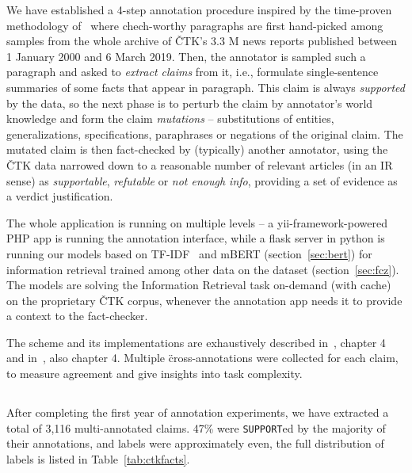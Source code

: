 We have established a 4-step annotation procedure inspired by the time-proven methodology of~\cite{fever} where chech-worthy paragraphs are first hand-picked among samples from the whole archive of ČTK's 3.3 M news reports published between 1 January 2000 and 6 March 2019. Then, the annotator is sampled such a paragraph and asked to \textit{extract claims} from it, i.e., formulate single-sentence summaries of some facts that appear in paragraph. This claim is always \textit{supported} by the data, so the next phase is to perturb the claim by annotator's world knowledge and form the claim \textit{mutations} -- substitutions of entities, generalizations, specifications, paraphrases or negations of the original claim. 
The mutated claim is then fact-checked by (typically) another annotator, using the ČTK data narrowed down to a reasonable number of relevant articles (in an IR sense) as \textit{supportable}, \textit{refutable} or \textit{not enough info}, providing a set of evidence as a verdict justification.

The whole application is running on multiple levels -- a yii-framework-powered PHP app is running the annotation interface, while a flask server in python is running our models based on TF-IDF~\cite{drqa} and mBERT (section~\ref{sec:bert}) for information retrieval trained among other data on the \FCZ dataset (section~\ref{sec:fcz}).
The models are solving the Information Retrieval task on-demand (with cache) on the proprietary ČTK corpus, whenever the annotation app needs it to provide a context to the fact-checker.

The scheme and its implementations are exhaustively described in~\cite{diplomka}, chapter 4 and in~\cite{lrev}, also chapter 4.
Multiple \"{cross-annotations} were collected for each claim, to measure agreement and give insights into task complexity.

\subsection{\CTK}
\label{sec:ctkfacts}


After completing the first year of annotation experiments, we have extracted a total of 3,116 multi-annotated claims.
47\% were \texttt{SUPPORT}ed by the majority of their annotations, \REF{} and \NEI{} labels were approximately even, the full distribution of labels is listed in Table~\ref{tab:ctkfacts}.

